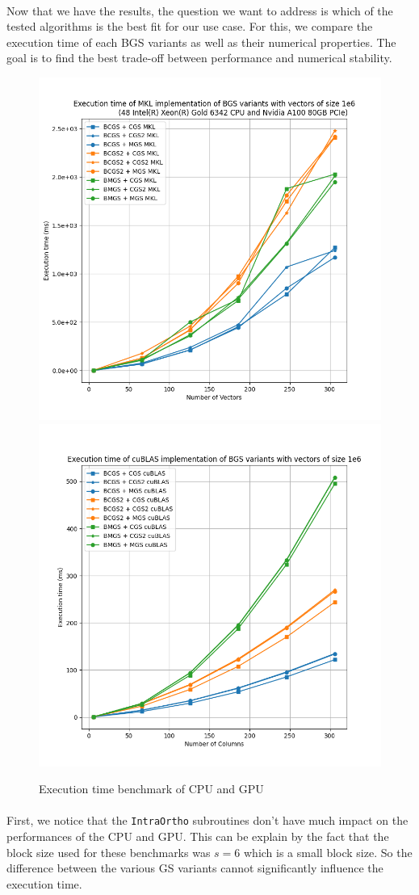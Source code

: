 \paragraph*{}
Now that we have the results, the question we want to address is which of the tested algorithms is the best fit for our use case. For this, we compare the execution time of each BGS variants as well as their numerical properties. The goal is to find the best trade-off between performance and numerical stability.

\begin{figure}[h]
    \centering
    \includegraphics[width=0.49\linewidth]{results/orthogo_bench/time_bench_mkl.png}
    \includegraphics[width=0.49\linewidth]{results/orthogo_bench/time_bench_cublas.png}
    \caption{Execution time benchmark of CPU and GPU}
    \label{fig:bench_A100_time}
\end{figure}

\paragraph*{}
First, we notice that the \texttt{IntraOrtho} subroutines don't have much impact on the performances of the CPU and GPU. This can be explain by the fact that the block size used for these benchmarks was $s=6$ which is a small block size. So the difference between the various GS variants cannot significantly influence the execution time.

